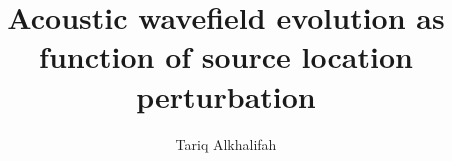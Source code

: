 \def\bea{\begin{eqnarray}}
\def\eea{  \end{eqnarray}}

\def\beq{\begin{equation}}
\def\eeq{\end{equation}}
\def\beqa{\begin{eqnarray}}
\def\eeqa{\end{eqnarray}}


\title{Acoustic wavefield evolution as function of source location perturbation}




\author{Tariq Alkhalifah}

\maketitle

